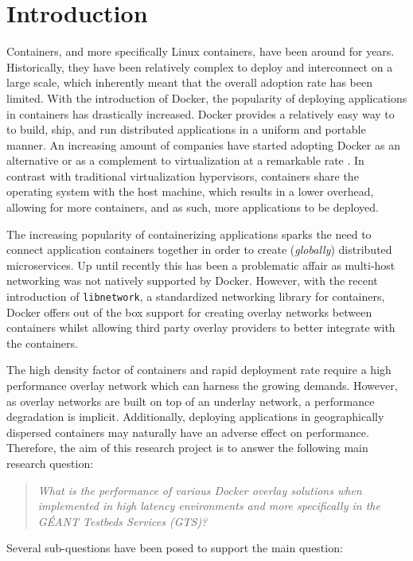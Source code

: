 \section{Introduction} \label{intro}
Containers, and more specifically Linux containers, have been around for years. Historically, they have been relatively complex to deploy and interconnect on a large scale, which inherently meant that the overall adoption rate has been limited. With the introduction of Docker, the popularity of deploying applications in containers has drastically increased. Docker provides a relatively easy way to to build, ship, and run distributed applications in a uniform and portable manner. An increasing amount of companies have started adopting Docker as an alternative or as a complement to virtualization at a remarkable rate \cite{stackengine_2015}. In contrast with traditional virtualization hypervisors, containers share the operating system with the host machine, which results in a lower overhead, allowing for more containers, and as such, more applications to be deployed. 

The increasing popularity of containerizing applications sparks the need to connect application containers together in order to create (\textit{globally}) distributed microservices. Up until recently this has been a problematic affair as multi-host networking was not natively supported by Docker. However, with the recent introduction of \texttt{libnetwork}, a standardized networking library for containers, Docker offers out of the box support for creating overlay networks between containers whilst allowing third party overlay providers to better integrate with the containers. 

The high density factor of containers and rapid deployment rate require a high performance overlay network which can harness the growing demands. However, as overlay networks are built on top of an underlay network, a performance degradation is implicit. Additionally, deploying applications in geographically dispersed containers may naturally have an adverse effect on performance. Therefore, the aim of this research project is to answer the following main research question:

\begin{quote}
\textit{What is the performance of various Docker overlay solutions when implemented in high latency environments and more specifically in the GÉANT Testbeds Services (GTS)?}
\end{quote}

\noindent
Several sub-questions have been posed to support the main question:

